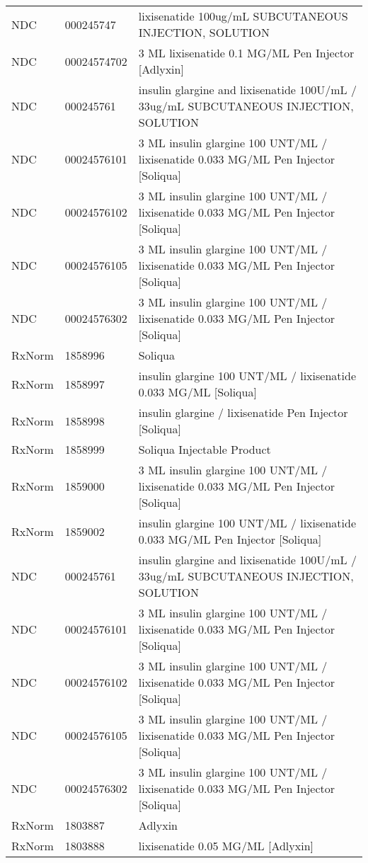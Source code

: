 \begin{longtable}{p{}p{}p{}}
  NDC & 000245747 & lixisenatide 100ug/mL SUBCUTANEOUS INJECTION, SOLUTION \\ 
  NDC & 00024574702 & 3 ML lixisenatide 0.1 MG/ML Pen Injector [Adlyxin] \\ 
  NDC & 000245761 & insulin glargine and lixisenatide 100U/mL / 33ug/mL SUBCUTANEOUS INJECTION, SOLUTION \\ 
  NDC & 00024576101 & 3 ML insulin glargine 100 UNT/ML / lixisenatide 0.033 MG/ML Pen Injector [Soliqua] \\ 
  NDC & 00024576102 & 3 ML insulin glargine 100 UNT/ML / lixisenatide 0.033 MG/ML Pen Injector [Soliqua] \\ 
  NDC & 00024576105 & 3 ML insulin glargine 100 UNT/ML / lixisenatide 0.033 MG/ML Pen Injector [Soliqua] \\ 
  NDC & 00024576302 & 3 ML insulin glargine 100 UNT/ML / lixisenatide 0.033 MG/ML Pen Injector [Soliqua] \\ 
  RxNorm & 1858996 & Soliqua \\ 
  RxNorm & 1858997 & insulin glargine 100 UNT/ML / lixisenatide 0.033 MG/ML [Soliqua] \\ 
  RxNorm & 1858998 & insulin glargine / lixisenatide Pen Injector [Soliqua] \\ 
  RxNorm & 1858999 & Soliqua Injectable Product \\ 
  RxNorm & 1859000 & 3 ML insulin glargine 100 UNT/ML / lixisenatide 0.033 MG/ML Pen Injector [Soliqua] \\ 
  RxNorm & 1859002 & insulin glargine 100 UNT/ML / lixisenatide 0.033 MG/ML Pen Injector [Soliqua] \\ 
  NDC & 000245761 & insulin glargine and lixisenatide 100U/mL / 33ug/mL SUBCUTANEOUS INJECTION, SOLUTION \\ 
  NDC & 00024576101 & 3 ML insulin glargine 100 UNT/ML / lixisenatide 0.033 MG/ML Pen Injector [Soliqua] \\ 
  NDC & 00024576102 & 3 ML insulin glargine 100 UNT/ML / lixisenatide 0.033 MG/ML Pen Injector [Soliqua] \\ 
  NDC & 00024576105 & 3 ML insulin glargine 100 UNT/ML / lixisenatide 0.033 MG/ML Pen Injector [Soliqua] \\ 
  NDC & 00024576302 & 3 ML insulin glargine 100 UNT/ML / lixisenatide 0.033 MG/ML Pen Injector [Soliqua] \\ 
  RxNorm & 1803887 & Adlyxin \\ 
  RxNorm & 1803888 & lixisenatide 0.05 MG/ML [Adlyxin] \\ 

\end{longtable}
